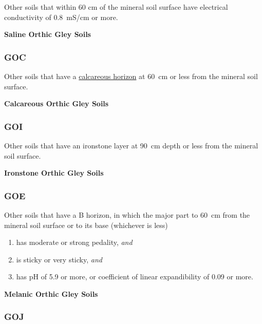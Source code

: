 \documentclass[
  letterpaper,
  DIV=11,
  numbers=noendperiod]{scrreprt}
\providecommand{\tightlist}{%
  \setlength{\itemsep}{0pt}\setlength{\parskip}{0pt}}\usepackage{longtable,booktabs,array}
\begin{document}
Other soils that within 60 cm of the mineral soil surface have
electrical conductivity of 0.8~mS/cm or more.

\textbf{Saline Orthic Gley Soils}

\hypertarget{sec-key-GOC}{%
\subsubsection{\texorpdfstring{\textbf{GOC}}{GOC}}\label{sec-key-GOC}}

Other soils that have a \protect\hyperlink{sec-diag-calch}{calcareous
horizon} at 60~cm or less from the mineral soil surface.

\textbf{Calcareous Orthic Gley Soils}

\hypertarget{sec-key-GOI}{%
\subsubsection{\texorpdfstring{\textbf{GOI}}{GOI}}\label{sec-key-GOI}}

Other soils that have an ironstone layer at 90~cm depth or less from the
mineral soil surface.

\textbf{Ironstone Orthic Gley Soils}

\hypertarget{sec-key-GOE}{%
\subsubsection{\texorpdfstring{\textbf{GOE}}{GOE}}\label{sec-key-GOE}}

Other soils that have a B horizon, in which the major part to 60~cm from
the mineral soil surface or to its base (whichever is less)

\begin{enumerate}
\def\labelenumi{\arabic{enumi}.}
\tightlist
\item
  has moderate or strong pedality, \emph{and}
\item
  is sticky or very sticky, \emph{and}
\item
  has pH of 5.9 or more, or coefficient of linear expandibility of 0.09
  or more.
\end{enumerate}

\textbf{Melanic Orthic Gley Soils}

\hypertarget{sec-key-GOJ}{%
\subsubsection{\texorpdfstring{\textbf{GOJ}}{GOJ}}\label{sec-key-GOJ}}
\end{document}
